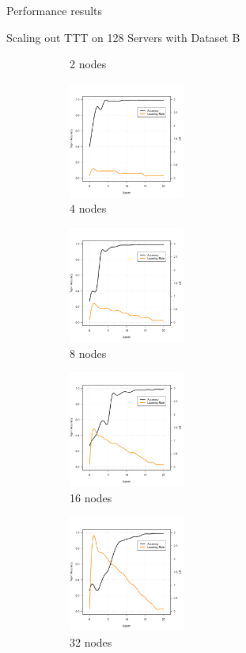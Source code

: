 \begin{section}{Performance results}
\begin{subsection}{Scaling out TTT on 128 Servers with Dataset B}
\begin{figure}[t!]
\begin{subfigure}[b]{0.25\textwidth}
			\caption{2 nodes}
			\end{subfigure}%
		    \begin{subfigure}[b]{0.25\textwidth}
		   		\includegraphics[height=1.5in]{figure7c.pdf}
		    \caption{4 nodes}
		    \end{subfigure}%
		    \begin{subfigure}[b]{0.25\textwidth}
		   		\includegraphics[height=1.5in]{figure7d.pdf}
		    \caption{8 nodes}
		    \end{subfigure}
		    \begin{subfigure}[b]{0.25\textwidth}
		    	\includegraphics[height=1.5in]{figure7e.pdf}
		    \caption{16 nodes}
		    \end{subfigure}%
		    \begin{subfigure}[b]{0.25\textwidth}
		    	\includegraphics[height=1.5in]{figure7f.pdf}
		    \caption{32 nodes}
		    \end{subfigure}%
			\begin{subfigure}[b]{0.25\textwidth}

\end{subfigure}
\end{figure}
\end{subsection}
\end{section}
